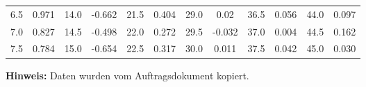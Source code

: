 \begin{threeparttable}
\begin{tabular}{*{12}{c}}
        6.5     & 0.971     & 14.0      & -0.662    & 21.5     & 0.404      & 29.0      & 0.02      & 36.5      & 0.056     & 44.0      & 0.097   \\
        7.0     & 0.827     & 14.5      & -0.498    & 22.0     & 0.272      & 29.5      & -0.032    & 37.0      & 0.004     & 44.5      & 0.162   \\
        7.5     & 0.784     & 15.0      & -0.654    & 22.5     & 0.317      & 30.0      & 0.011     & 37.5      & 0.042     & 45.0      & 0.030   \\
        \bottomrule
    \end{tabular}
    \begin{tablenotes}
        \small
        \item \textbf{Hinweis:} Daten wurden vom Auftragsdokument kopiert.
    \end{tablenotes}
\end{threeparttable}



